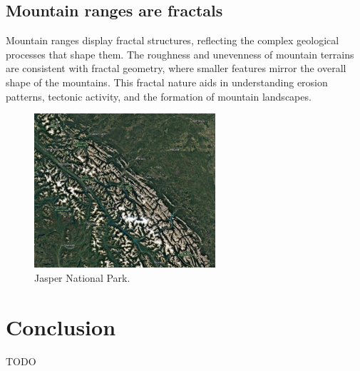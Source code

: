 \documentclass[12pt]{article}
\begin{document}
\subsection{Mountain ranges are fractals}
Mountain ranges display fractal structures, reflecting the complex geological processes that shape them. The roughness and unevenness of mountain terrains are consistent with fractal geometry, where smaller features mirror the overall shape of the mountains. This fractal nature aids in understanding erosion patterns, tectonic activity, and the formation of mountain landscapes.

\begin{figure}[H]
\centering
\includegraphics[width=0.6\textwidth]{assets/fractal-jasper.png}
\caption{Jasper National Park.}
\label{fig:fractal-jasper}
\end{figure}

\section{Conclusion}
TODO



\nocite{*} 
 

\end{document}
